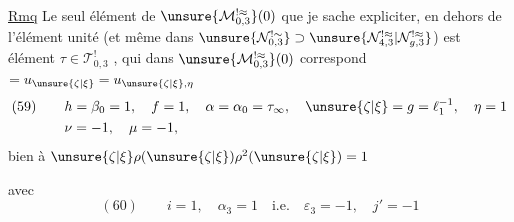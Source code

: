 \uline{Rmq} Le seul élément de
$\unsure{\mathcal M_{0,3}^{!\approx}}(0)$
que je sache expliciter, en dehors de l'élément unité
(et  même dans
$\unsure{\mathcal N_{0,3}^{!\sim}}\supset
\unsure{\mathcal N_{4,3}^{!\approx}|\mathcal N_{g,3}^{!\approx}}$)
est  élément
$\tau\in\mathcal T_{0,3}^{!}$
,
qui dans $\unsure{\mathcal M_{0,3}^{!\approx}}(0)$ correspond
$=u_{\unsure{\zeta|\xi}}=u_{\unsure{\zeta|\xi},\eta}$
\[
\begin{aligned}
(59)\qquad & h=\beta_0=1,\quad f=1,\quad
\alpha=\alpha_0=\tau_\infty,\quad
\unsure{\zeta|\xi}=g=\ell_1^{-1},\quad\eta=1
\\
&\nu=-1,\quad\mu=-1,
\end{aligned}
\]
 bien à 
\uline{$\unsure{\zeta|\xi}\rho(\unsure{\zeta|\xi})
\rho^2(\unsure{\zeta|\xi})=1$}
\deleted{
\[
\widehat\varphi(\unsure{\zeta|\xi})=\ell_0,\qquad
\widehat\varphi\bigl(\unsure{\rho^{-1}}(\unsure{\zeta|\xi}^{-1})\bigr)
=\unsure{\varepsilon_0},
\]
\[
\widehat\varphi\bigl(\rho^{-1}(\unsure{\zeta|\xi}^{-1})\bigr)
\rho\bigl(\widehat\varphi(\rho^{-1}(\unsure{\zeta|\xi}^{-1}))\bigr)^{-1}
=\unsure{\varepsilon_0\varepsilon_1^{-1}}
=(\sigma_\infty\rho)(\rho\sigma_\infty)^{-1}.
\]
}


avec
\[
(60)\qquad i=1,\quad\alpha_3=1\quad\text{i.e.}\quad
\varepsilon_3=-1,\quad j'=-1
\]

